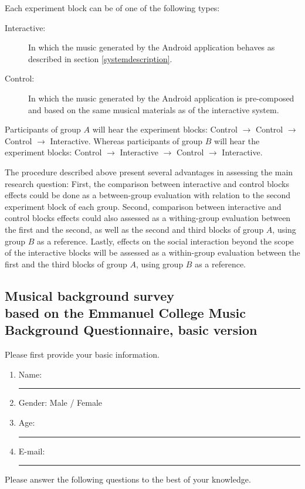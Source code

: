 \documentclass[a4paper,11pt]{article}
\newcommand{\myunderline}{\rule{2in}{.5pt}}
\begin{document}
{Each experiment block can be of one of the following types:
\begin{description}
	\item[Interactive:] In which the music generated by the Android application behaves as described in section \ref{systemdescription}.
	\item[Control:] In which the music generated by the Android application is pre-composed and based on the same musical materials as of the interactive system.
\end{description}

Participants of group $A$ will hear the experiment blocks: Control $\rightarrow$ Control $\rightarrow$ Control $\rightarrow$ Interactive. Whereas participants of group $B$ will hear the experiment blocks: Control $\rightarrow$ Interactive $\rightarrow$ Control $\rightarrow$ Interactive.

The procedure described above present several advantages in assessing the main research question:
First, the comparison between interactive and control blocks effects could be done as a between-group evaluation with relation to the second experiment block of each group.
Second, comparison between interactive and control blocks effects could also assessed as a withing-group evaluation between the first and the second, as well as the second and third blocks of group $A$, using group $B$ as a reference.
Lastly, effects on the social interaction beyond the scope of the interactive blocks will be assessed as a within-group evaluation between the first and the third blocks of group $A$, using group $B$ as a reference.

\begin{appendices}

\section[Musical background survey]{Musical background survey\\
	{\normalsize based on the Emmanuel College Music Background Questionnaire, basic version}}

Please first provide your basic information.

\begin{enumerate}
	\item Name: \myunderline
	\item Gender: Male / Female
	\item Age: \myunderline
	\item E-mail: \myunderline
\end{enumerate}
Please answer the following questions to the best of your knowledge.
\begin{enumerate}[resume]


\end{enumerate}
\end{appendices}}
\end{document}
